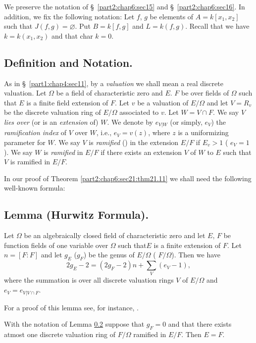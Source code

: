 We preserve the notation of \S\ \ref{part2:chap6:sec15} and
\S\ \ref{part2:chap6:sec16}. In addition, we fix the following
notation: Let $f$, $g$ be elements of $A= k[x_1, x_2]$ such that $J(f,
g)=\diameter $. Put $B= k[f, g]$ and $L = k (f, g)$. Recall that we
have $k= k(x_1, x_2)$ and that char $k=0$.


\subsection{Definition and Notation.}\label{part2:chap6:sec21:ss21.1}

As in \S\ \ref{part1:chap4:sec11}, by a {\em valuation} we shall mean
a real discrete valuation. Let $\Omega$ be a field of characteristic
zero and $E$. $F$ be over fields of $\Omega$ such that $E$ is a finite
field extension of $F$. Let $v$ be a valuation of $E /\Omega$ and let
$V= R_v$ be the discrete valuation ring of $E/\Omega$ associated to
$v$. Let $W= V \cap F$. We say $V$ {\em lies over} (or is an {\em
  extension} of) $W$. We denote by $e_{V|W}$ (or simply, $e_V$) the
{\em ramification index} of $V$ over $W$, i.e., $e_V = v(z)$, where
$z$ is a uniformizing parameter for $W$. We say $V$ is {\em ramified}
() in the extension $E/F$ if $E_v > 1$ (\resp
$e_V=1$). We say $W$ is {\em ramified} in $E/F$ if there exists an
extension $V$ of $W$ to $E$ such that $V$ is ramified in $E/F$.

In our proof of Theorem \ref{part2:chap6:sec21:thm21.11} we shall need
the following well-known formula:

\subsection{Lemma (Hurwitz Formula).}\label{part2:chap6:sec21:ss21.2}

Let $\Omega$ be an algebraically closed field of characteristic zero
and let $E$, $F$ be function fields of one variable over $\Omega$ such 
that\pageoriginale $E$ is a finite extension of $F$. Let $n = [F: F]$
and let $g_E$ (\resp $g_F$) be the genus of $E/\Omega$ (\resp
$F/\Omega$). Then we have
$$
2 g_E - 2 = (2 g_F - 2)n+ \sum_V (e_V-1),
$$
where the summation is over all discrete valuation rings $V$ of
$E/\Omega$ and $e_V = e_{V|V \cap F}$.

For a proof of this lemma see, for instance, \cite{4}.

\setcounter{thm}{2}
\begin{coro}\label{part2:chap6:sec21:coro21.3}
  With the notation of Lemma \ref{part2:chap6:sec21:ss21.2} suppose
  that $g_F=0$ and that there exists atmost one discrete valuation
  ring of $F/\Omega$ ramified in $E/F$. Then $E= F$.
\end{coro}

